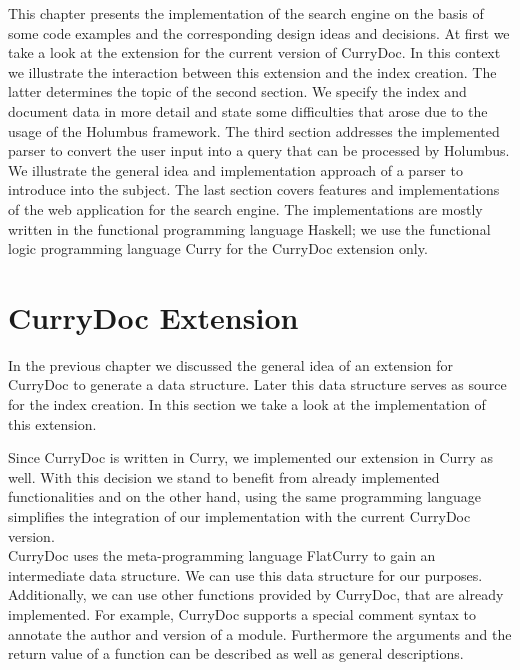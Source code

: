 \documentclass[%
	pdftex,%
	a4paper,%
	oneside,%
	chapterprefix,%
	headsepline,%
	12pt%
]{scrbook}
\begin{document}
This chapter presents the implementation of the search engine on the
basis of some code examples and the corresponding design ideas and
decisions. %
At first we take a look at the extension for the current version of
CurryDoc. %
In this context we illustrate the interaction between this extension
and the index creation. %
The latter determines the topic of the second section. %
We specify the index and document data in more detail and state some
difficulties that arose due to the usage of the Holumbus framework. %
The third section addresses the implemented parser to convert the user
input into a query that can be processed by Holumbus. %
We illustrate the general idea and implementation approach of a parser
to introduce into the subject. %
The last section covers features and implementations of the web
application for the search engine. %
The implementations are mostly written in the functional programming
language Haskell; we use the functional logic programming language
Curry for the CurryDoc extension only.\\


\section{CurryDoc Extension}\label{implementation:currydoc}

In the previous chapter we discussed the general idea of an extension
for CurryDoc to generate a data structure. %
Later this data structure serves as source for the index creation.%
In this section we take a look at the implementation of this
extension.

Since CurryDoc is written in Curry, we implemented our extension in
Curry as well. %
With this decision we stand to benefit from already implemented
functionalities and on the other hand, using the same programming
language simplifies the integration of our implementation with the
current CurryDoc version.\\

CurryDoc uses the meta-programming language FlatCurry to gain an
intermediate data structure. %
We can use this data structure for our purposes. %
Additionally, we can use other functions provided by CurryDoc, that
are already implemented. %
For example, CurryDoc supports a special comment syntax to annotate
the author and version of a module. %
Furthermore the arguments and the return value of a function can be
described as well as general descriptions.
\end{document}
